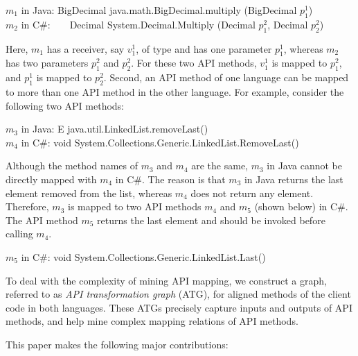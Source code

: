 \begin{CodeOut}
$m_1$ in Java: BigDecimal java.math.BigDecimal.multiply (BigDecimal $p_1^1$)\\
\hspace*{0.12in}$m_2$ in C\#:\ \ \ \  Decimal
System.Decimal.Multiply (Decimal $p_1^2$, Decimal $p_2^2$)
\end{CodeOut}

Here, $m_1$ has a receiver, say $v_1^1$, of type 
and has one parameter $p_1^1$, whereas $m_2$ has two parameters $p_1^2$
and $p_2^2$. For these two API methods, $v_1^1$ is
mapped to $p_1^2$, and $p_1^1$ is mapped to $p_2^2$. Second, an API
method of one language can be mapped to more than one API method in the
other language. For example, consider the following two API methods:

\begin{CodeOut}
$m_3$ in Java: E java.util.LinkedList.removeLast()\\
\hspace*{0.12in}$m_4$ in C\#: void System.Collections.Generic.LinkedList.RemoveLast()
\end{CodeOut}

Although the method names of $m_3$ and $m_4$ are the same, $m_3$ in Java
cannot be directly mapped with $m_4$ in C\#. The reason is that $m_3$ in Java
returns the last element removed from the list, whereas $m_4$ does not return any
element. Therefore, $m_3$ is mapped to two API methods $m_4$ and $m_5$ (shown below) in C\#.
The API method $m_5$ returns the last element and should be invoked before calling $m_4$.

\begin{CodeOut}
$m_5$ in C\#: void System.Collections.Generic.LinkedList.Last()
\end{CodeOut}

To deal with the complexity of mining API mapping, we construct a
graph, referred to as \emph{API transformation graph} (ATG), for
aligned methods of the client code in both languages. These ATGs
precisely capture inputs and outputs of API methods, and help mine
complex mapping relations of API methods.

This paper makes the following major contributions:

